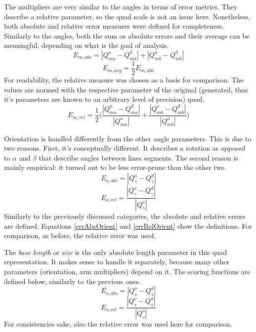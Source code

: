 The multipliers are very similar to the angles in terms of error metrics.
They describe a relative parameter, so the quad scale is not an issue here.
Nonetheless, both absolute and relative error measures were defined for completeness.
Similarly to the angles, both the sum os absolute errors and their average can be meaningful, depending on what is the goal of analysis.
\begin{equation}
	E_{m,abs} = |Q_{ma}^o - Q_{ma}^d| + |Q_{mb}^o - Q_{mb}^d|
	\label{eq:errAbsSumMul}
\end{equation}
\begin{equation}
	E_{m,avg} = \frac{1}{2} E_{m,abs}
	\label{eq:errAbsAvgMul}
\end{equation}
For readability, the relative measure was chosen as a basis for comparison.
The values are normed with the respective parameter of the original (generated, thus it's parameters are known to an arbitrary level of precision) quad.
\begin{equation}
	E_{m,rel} = \frac{1}{2}\Bigg(\frac{|Q_{ma}^o - Q_{ma}^d|}{|Q_{ma}^o|} + \frac{|Q_{mb}^o - Q_{mb}^d|}{|Q_{mb}^o|}\Bigg)
	\label{eq:errRelAvgMul}
\end{equation}

Orientation is handled differently from the other angle parameters.
This is due to two reasons.
First, it's conceptually different.
It describes a rotation as opposed to $\alpha$ and $\beta$ that describe angles between lines segments.
The second reason is mainly empirical: it turned out to be less error-prune than the other two.
\begin{equation}
	E_{o,abs} = |Q_\gamma^o - Q_\gamma^d|
	\label{eq:errAbsOrient}
\end{equation}
\begin{equation}
	E_{o,rel} = \frac{|Q_\gamma^o - Q_\gamma^d|}{|Q_\gamma^o|}
	\label{eq:errRelOrient}
\end{equation}
Similarly to the previously discussed categories, the absolute and relative errors are defined.
Equations \eqref{errAbsOrient} and \eqref{errRelOrient} show the definitions.
For comparison, as before, the relative error was used.

The \textit{base length} or \textit{size} is the only absolute length parameter in this quad representation.
It makes sense to handle it separately, because many other parameters (orientation, arm multipliers) depend on it.
The scoring functions are defined below, similarly to the previous ones.
\begin{equation}
	E_{o,abs} = |Q_s^o - Q_s^d|
	\label{eq:errAbsSize}
\end{equation}
\begin{equation}
	E_{o,rel} = \frac{|Q_s^o - Q_s^d|}{|Q_s^o|}
	\label{eq:errRelSize}
\end{equation}
For consistencies sake, also the relative error was used here for comparison.

